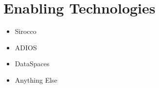 \section*{Enabling Technologies}

\begin{itemize}

\item Sirocco
\item ADIOS
\item DataSpaces
\item Anything Else

\end{itemize}
